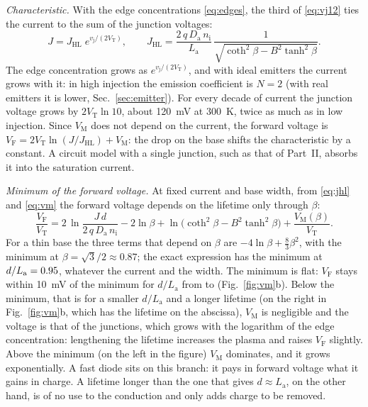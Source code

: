 \documentclass[10pt,a4paper]{scrartcl}
\newcommand{\VF}{V_\mathrm{F}}
\newcommand{\vj}{v_\mathrm{j}}
\newcommand{\VT}{V_\mathrm{T}}
\newcommand{\Nem}{N}                          %
\newcommand{\nint}{n_\mathrm{i}}
\newcommand{\Da}{D_\mathrm{a}}
\newcommand{\La}{L_\mathrm{a}}
\newcommand{\VM}{V_\mathrm{M}}
\begin{document}
\emph{Characteristic.} With the edge concentrations \eqref{eq:edges}, the third of \eqref{eq:vj12} ties the current to the sum of the junction voltages:
\begin{equation}
J = J_\mathrm{HL}\;e^{\vj/(2\VT)} , \qquad J_\mathrm{HL} = \frac{2\,q\,\Da\,\nint}{\La}\,\frac{1}{\sqrt{\coth^2\beta - B^2\tanh^2\beta}} .
\label{eq:jhl}
\end{equation}
The edge concentration grows as $e^{\vj/(2\VT)}$, and with ideal emitters the current grows with it: in high injection the emission coefficient is $\Nem = 2$ (with real emitters it is lower, Sec.~\ref{sec:emitter}). For every decade of current the junction voltage grows by $2\VT\ln 10$, about \SI{120}{\milli\volt} at \SI{300}{\kelvin}, twice as much as in low injection. Since $\VM$ does not depend on the current, the forward voltage is $\VF = 2\VT\ln(J/J_\mathrm{HL}) + \VM$: the drop on the base shifts the characteristic by a constant. A circuit model with a single junction, such as that of Part~II, absorbs it into the saturation current.

\emph{Minimum of the forward voltage.} At fixed current and base width, from \eqref{eq:jhl} and \eqref{eq:vm} the forward voltage depends on the lifetime only through $\beta$:
\begin{equation}
\frac{\VF}{\VT} = 2\,\ln\frac{J\,d}{2\,q\,\Da\,\nint} - 2\ln\beta + \ln\bigl(\coth^2\beta - B^2\tanh^2\beta\bigr) + \frac{\VM(\beta)}{\VT} .
\label{eq:vfbeta}
\end{equation}
For a thin base the three terms that depend on $\beta$ are $-4\ln\beta + \tfrac{8}{3}\beta^2$, with the minimum at $\beta = \sqrt{3}/2 \approx \num{0.87}$; the exact expression has the minimum at $d/\La = \pdVfMinBeta$, whatever the current and the width. The minimum is flat: $\VF$ stays within \SI{10}{\milli\volt} of the minimum for $d/\La$ from \pdVfFlatLo{} to \pdVfFlatHi{} (Fig.~\ref{fig:vm}b). Below the minimum, that is for a smaller $d/\La$ and a longer lifetime (on the right in Fig.~\ref{fig:vm}b, which has the lifetime on the abscissa), $\VM$ is negligible and the voltage is that of the junctions, which grows with the logarithm of the edge concentration: lengthening the lifetime increases the plasma and raises $\VF$ slightly. Above the minimum (on the left in the figure) $\VM$ dominates, and it grows exponentially. A fast diode sits on this branch: it pays in forward voltage what it gains in charge. A lifetime longer than the one that gives $d \approx \La$, on the other hand, is of no use to the conduction and only adds charge to be removed.
\end{document}

